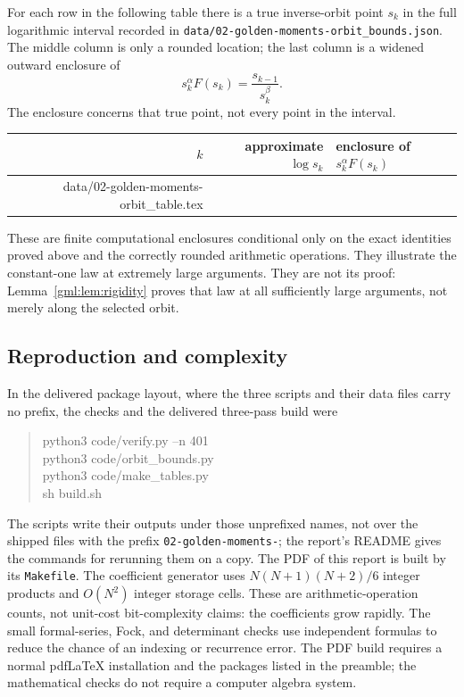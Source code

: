 \documentclass[11pt]{article}
\makeatletter
\numberwithin{equation}{section}
\theoremstyle{definition}
\theoremstyle{remark}
\newcommand{\tableinput}[1]{\@@input #1 }
\makeatother
\begin{document}
For each row in the following table there is a true inverse-orbit point
$s_k$ in the full logarithmic interval recorded in
\texttt{data/02-golden-moments-orbit\_bounds.json}. The middle column is only a rounded
location; the last column is a widened outward enclosure of
\[
 s_k^\alpha F(s_k)=\frac{s_{k-1}}{s_k^\beta}.
\]
The enclosure concerns that true point, not every point in the interval.
\begin{center}
\small
\begin{tabular}{r r l}
\toprule
$k$&approximate $\log s_k$&enclosure of $s_k^\alpha F(s_k)$\\
\midrule
\tableinput{data/02-golden-moments-orbit_table.tex}
\bottomrule
\end{tabular}
\end{center}
These are finite computational enclosures conditional only on the exact
identities proved above and the correctly rounded arithmetic operations.
They illustrate the constant-one law at extremely large arguments. They
are not its proof: Lemma~\ref{gml:lem:rigidity} proves that law at all sufficiently
large arguments, not merely along the selected orbit.

\subsection{Reproduction and complexity}
In the delivered package layout, where the three scripts and their data
files carry no prefix, the checks and the delivered three-pass build were
\begin{quote}\ttfamily\small
python3 code/verify.py --n 401\\
python3 code/orbit\_bounds.py\\
python3 code/make\_tables.py\\
sh build.sh
\end{quote}
The scripts write their outputs under those unprefixed names, not over the
shipped files with the prefix \texttt{02-golden-moments-}; the report's
README gives the commands for rerunning them on a copy. The PDF of this
report is built by its \texttt{Makefile}.
The coefficient generator uses
$N(N+1)(N+2)/6$ integer products and $O(N^2)$ integer storage cells.
These are arithmetic-operation counts, not unit-cost bit-complexity
claims: the coefficients grow rapidly. The small formal-series, Fock,
and determinant checks use independent formulas to reduce the chance of
an indexing or recurrence error. The PDF build requires a normal
pdfLaTeX installation and the packages listed in the preamble; the
mathematical checks do not require a computer algebra system.
\end{document}
